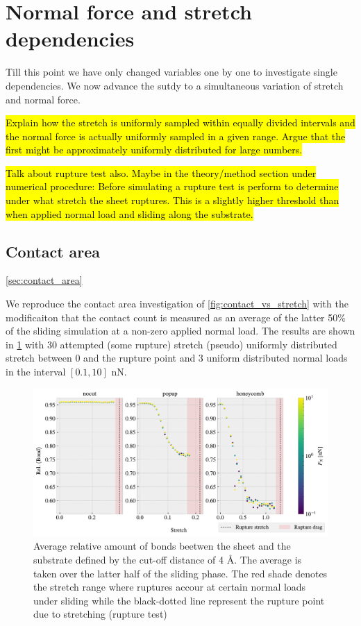 \section{Normal force and stretch dependencies}
Till this point we have only changed variables one by one to investigate single dependencies. We now advance the sutdy to a simultaneous variation of stretch and normal force.

\hl{Explain how the stretch is uniformly sampled within equally divided intervals and the normal force is actually uniformly sampled in a given range. Argue that the first might be approximately uniformly distributed for large numbers.}

\hl{Talk about rupture test also. Maybe in the theory/method section under numerical procedure: Before simulating a rupture test is perform to determine under what stretch the sheet ruptures. This is a slightly higher threshold than when applied normal load and sliding along the substrate.}

\subsection{Contact area}\cref{sec:contact_area}

We reproduce the contact area investigation of \cref{fig:contact_vs_stretch} with the modificaiton that the contact count is measured as an average of the latter 50\% of the sliding simulation at a non-zero applied normal load. The results are shown in \cref{fig:multi_stretch_contact} with 30 attempted (some rupture) stretch (pseudo) uniformly distributed stretch between 0 and the rupture point and 3 uniform distributed normal loads in the interval $[0.1, 10]$ nN. 


\begin{figure}[H]
  \centering
  \includegraphics[width=\linewidth]{figures/baseline/multi_stretch_area_compare.pdf}
  \caption{Average relative amount of bonds beetwen the sheet and the substrate defined by the cut-off distance of 4 Å. The average is taken over the latter half of the sliding phase. The red shade denotes the stretch range where ruptures accour at certain normal loads under sliding while the black-dotted line represent the rupture point due to stretching (rupture test)}
  \label{fig:multi_stretch_contact}
\end{figure}

